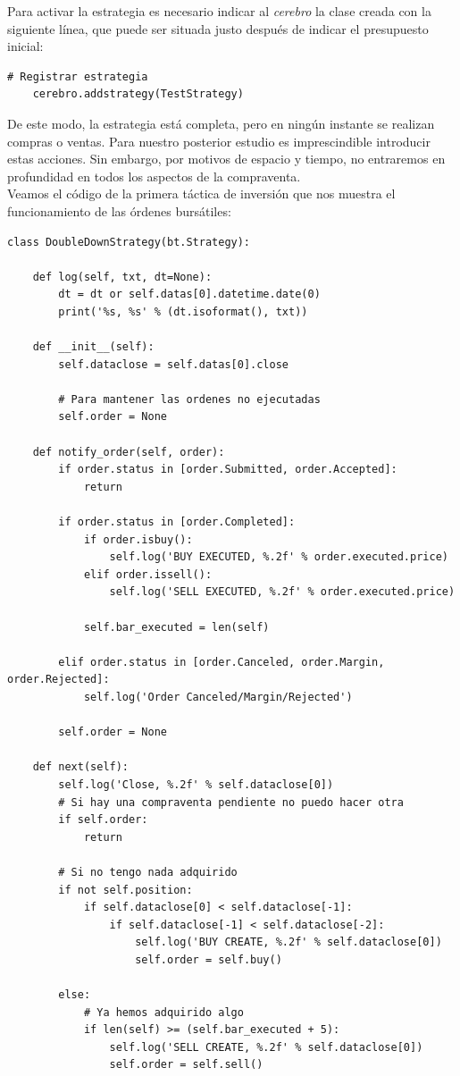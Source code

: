 		Para activar la estrategia es necesario indicar al \textit{cerebro} la clase creada con la siguiente l\'inea, que puede ser situada justo despu\'es de indicar el presupuesto inicial:\\

		\begin{lstlisting}[basicstyle=\tiny]
    # Registrar estrategia
    cerebro.addstrategy(TestStrategy)
		\end{lstlisting}	
		
		\vspace{0.4cm}
		
		De este modo, la estrategia est\'a completa, pero en ning\'un instante se realizan compras o ventas. Para nuestro posterior estudio es imprescindible introducir estas acciones. Sin embargo, por motivos de espacio y tiempo, no entraremos en profundidad en todos los aspectos de la compraventa.\\
		
		Veamos el c\'odigo de la primera t\'actica de inversi\'on que nos muestra el funcionamiento de las \'ordenes burs\'atiles:\\
		
		
		\begin{lstlisting}[basicstyle=\tiny]
class DoubleDownStrategy(bt.Strategy):

	def log(self, txt, dt=None):
		dt = dt or self.datas[0].datetime.date(0)
		print('%s, %s' % (dt.isoformat(), txt))

	def __init__(self):
		self.dataclose = self.datas[0].close

		# Para mantener las ordenes no ejecutadas
		self.order = None

	def notify_order(self, order):
		if order.status in [order.Submitted, order.Accepted]:
			return

		if order.status in [order.Completed]:
			if order.isbuy():
				self.log('BUY EXECUTED, %.2f' % order.executed.price)
			elif order.issell():
				self.log('SELL EXECUTED, %.2f' % order.executed.price)

			self.bar_executed = len(self)

		elif order.status in [order.Canceled, order.Margin, order.Rejected]:
			self.log('Order Canceled/Margin/Rejected')

		self.order = None

	def next(self):
		self.log('Close, %.2f' % self.dataclose[0])
		# Si hay una compraventa pendiente no puedo hacer otra
		if self.order:
			return

		# Si no tengo nada adquirido
		if not self.position:
			if self.dataclose[0] < self.dataclose[-1]:
				if self.dataclose[-1] < self.dataclose[-2]:
					self.log('BUY CREATE, %.2f' % self.dataclose[0])
					self.order = self.buy()

		else:
			# Ya hemos adquirido algo
			if len(self) >= (self.bar_executed + 5):
				self.log('SELL CREATE, %.2f' % self.dataclose[0])
				self.order = self.sell()
		\end{lstlisting}
		
